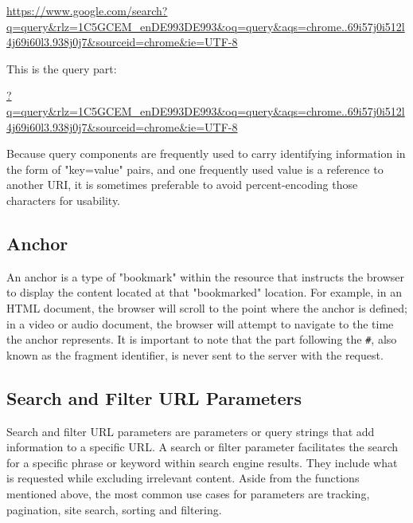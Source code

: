 \begin{center}
  \url{https://www.google.com/search?q=query&rlz=1C5GCEM_enDE993DE993&oq=query&aqs=chrome..69i57j0i512l4j69i60l3.938j0j7&sourceid=chrome&ie=UTF-8}
\end{center}

\noindent This is the query part:

\begin{center}
  \url{?q=query&rlz=1C5GCEM_enDE993DE993&oq=query&aqs=chrome..69i57j0i512l4j69i60l3.938j0j7&sourceid=chrome&ie=UTF-8}
\end{center}

Because query components are frequently used to carry identifying information in the form of "key=value" pairs, and one frequently used value is a reference to another URI, it is sometimes preferable to avoid percent-encoding those characters for usability.

\subsection{Anchor}
An anchor is a type of "bookmark" within the resource that instructs the browser to display the content located at that "bookmarked" location. For example, in an HTML document, the browser will scroll to the point where the anchor is defined; in a video or audio document, the browser will attempt to navigate to the time the anchor represents. It is important to note that the part following the \texttt{\#}, also known as the fragment identifier, is never sent to the server with the request.

\subsection{Search and Filter URL Parameters}
Search and filter URL parameters are parameters or query strings that add information to a specific URL. A search or filter parameter facilitates the search for a specific phrase or keyword within search engine results. They include what is requested while excluding irrelevant content. Aside from the functions mentioned above, the most common use cases for parameters are tracking, pagination, site search, sorting and filtering.

